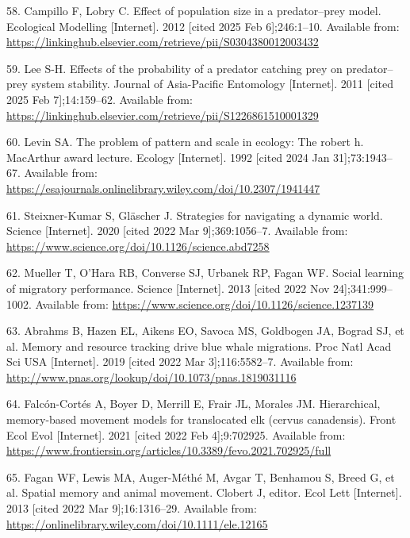 \documentclass[
  12pt,
]{article}
\newlength{\cslhangindent}
\newenvironment{CSLReferences}[2] %
 {\begin{list}{}{%
  \setlength{\itemindent}{0pt}
  \setlength{\leftmargin}{0pt}
  \setlength{\parsep}{0pt}
  \ifodd #1
   \setlength{\leftmargin}{\cslhangindent}
   \setlength{\itemindent}{-1\cslhangindent}
  \fi
  \setlength{\itemsep}{#2\baselineskip}}}
 {\end{list}}
\begin{document}
\begin{CSLReferences}{0}{1}
58. Campillo F, Lobry C. Effect of population size in a predator--prey model. Ecological Modelling {[}Internet{]}. 2012 {[}cited 2025 Feb 6{]};246:1--10. Available from: \url{https://linkinghub.elsevier.com/retrieve/pii/S0304380012003432}

59. Lee S-H. Effects of the probability of a predator catching prey on predator--prey system stability. Journal of Asia-Pacific Entomology {[}Internet{]}. 2011 {[}cited 2025 Feb 7{]};14:159--62. Available from: \url{https://linkinghub.elsevier.com/retrieve/pii/S1226861510001329}

60. Levin SA. The problem of pattern and scale in ecology: The robert h. {MacArthur} award lecture. Ecology {[}Internet{]}. 1992 {[}cited 2024 Jan 31{]};73:1943--67. Available from: \url{https://esajournals.onlinelibrary.wiley.com/doi/10.2307/1941447}

61. Steixner-Kumar S, Gläscher J. Strategies for navigating a dynamic world. Science {[}Internet{]}. 2020 {[}cited 2022 Mar 9{]};369:1056--7. Available from: \url{https://www.science.org/doi/10.1126/science.abd7258}

62. Mueller T, O'Hara RB, Converse SJ, Urbanek RP, Fagan WF. Social learning of migratory performance. Science {[}Internet{]}. 2013 {[}cited 2022 Nov 24{]};341:999--1002. Available from: \url{https://www.science.org/doi/10.1126/science.1237139}

63. Abrahms B, Hazen EL, Aikens EO, Savoca MS, Goldbogen JA, Bograd SJ, et al. Memory and resource tracking drive blue whale migrations. Proc Natl Acad Sci {USA} {[}Internet{]}. 2019 {[}cited 2022 Mar 3{]};116:5582--7. Available from: \url{http://www.pnas.org/lookup/doi/10.1073/pnas.1819031116}

64. Falcón-Cortés A, Boyer D, Merrill E, Frair JL, Morales JM. Hierarchical, memory-based movement models for translocated elk (cervus canadensis). Front Ecol Evol {[}Internet{]}. 2021 {[}cited 2022 Feb 4{]};9:702925. Available from: \url{https://www.frontiersin.org/articles/10.3389/fevo.2021.702925/full}

65. Fagan WF, Lewis MA, Auger-Méthé M, Avgar T, Benhamou S, Breed G, et al. Spatial memory and animal movement. Clobert J, editor. Ecol Lett {[}Internet{]}. 2013 {[}cited 2022 Mar 9{]};16:1316--29. Available from: \url{https://onlinelibrary.wiley.com/doi/10.1111/ele.12165}


\end{CSLReferences}
\end{document}
